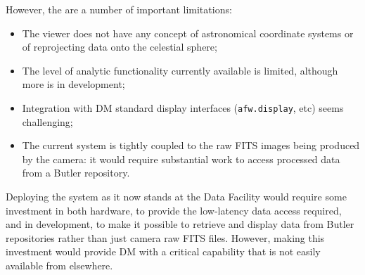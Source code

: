 However, the are a number of important limitations:

\begin{itemize}

  \item{The viewer does not have any concept of astronomical coordinate systems or of reprojecting data onto the celestial sphere;}
  \item{The level of analytic functionality currently available is limited, although more is in development;}
  \item{Integration with DM standard display interfaces (\texttt{afw.display}, etc) seems challenging;}
  \item{The current system is tightly coupled to the raw FITS images being produced by the camera: it would require substantial work to access processed data from a Butler repository.}

\end{itemize}

Deploying the system as it now stands at the Data Facility would require some investment in both hardware, to provide the low-latency data access required, and in development, to make it possible to retrieve and display data from Butler repositories rather than just camera raw FITS files.
However, making this investment would provide DM with a critical capability that is not easily available from elsewhere.



